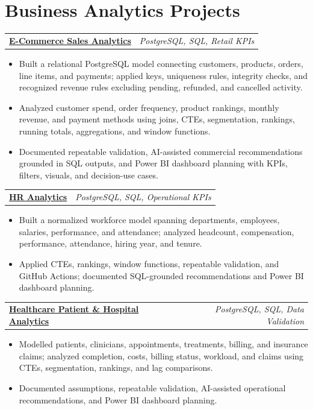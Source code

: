 \documentclass[letterpaper,10pt]{article}
\makeatletter
\newcommand{\project}[2]{%
  \begin{tabularx}{\textwidth}{@{}Xr@{}}
    \textbf{#1} & \textit{#2}
  \end{tabularx}\vspace{-1pt}
}
\makeatother
\begin{document}
\section{Business Analytics Projects}
\project{\href{https://github.com/jainalimehta/Ecommerce-Sales-Analytics}{E-Commerce Sales Analytics}}{PostgreSQL, SQL, Retail KPIs}
\begin{itemize}
  \item Built a relational PostgreSQL model connecting customers, products, orders, line items, and payments; applied keys, uniqueness rules, integrity checks, and recognized revenue rules excluding pending, refunded, and cancelled activity.
  \item Analyzed customer spend, order frequency, product rankings, monthly revenue, and payment methods using joins, CTEs, segmentation, rankings, running totals, aggregations, and window functions.
  \item Documented repeatable validation, AI-assisted commercial recommendations grounded in SQL outputs, and Power BI dashboard planning with KPIs, filters, visuals, and decision-use cases.
\end{itemize}
\vspace{1pt}

\project{\href{https://github.com/jainalimehta/HR-Analytics}{HR Analytics}}{PostgreSQL, SQL, Operational KPIs}
\begin{itemize}
  \item Built a normalized workforce model spanning departments, employees, salaries, performance, and attendance; analyzed headcount, compensation, performance, attendance, hiring year, and tenure.
  \item Applied CTEs, rankings, window functions, repeatable validation, and GitHub Actions; documented SQL-grounded recommendations and Power BI dashboard planning.
\end{itemize}
\vspace{1pt}

\project{\href{https://github.com/jainalimehta/Healthcare-Analytics}{Healthcare Patient \& Hospital Analytics}}{PostgreSQL, SQL, Data Validation}
\begin{itemize}
  \item Modelled patients, clinicians, appointments, treatments, billing, and insurance claims; analyzed completion, costs, billing status, workload, and claims using CTEs, segmentation, rankings, and lag comparisons.
  \item Documented assumptions, repeatable validation, AI-assisted operational recommendations, and Power BI dashboard planning.
\end{itemize}
\end{document}
